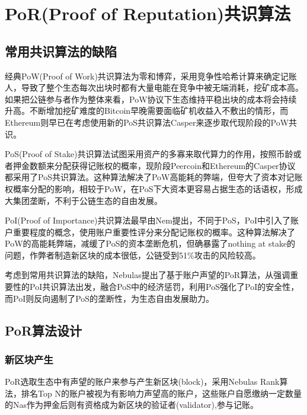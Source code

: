 \section{PoR(Proof of Reputation)共识算法}
\label{sec:por}

\subsection{常用共识算法的缺陷}
\label{por:weakness}

经典PoW(Proof of Work)共识算法为零和博弈，采用竞争性哈希计算来确定记账人，导致了整个生态每次出块时都有大量电能在竞争中被无端消耗，挖矿成本高。如果把公链参与者作为整体来看，PoW协议下生态维持平稳出块的成本将会持续升高。不断增加挖矿难度的Bitcoin早晚需要面临矿机收益入不敷出的情形，而Ethereum则早已在考虑使用新的PoS共识算法Casper\cite{casper}来逐步取代现阶段的PoW共识\cite{buterin2013ethereum}。

PoS(Proof of Stake)共识算法试图采用资产的多寡来取代算力的作用，按照币龄或者押金数额来分配获得记账权的概率，现阶段Peercoin\cite{king2012peercoin}和Ethereum的Casper协议都采用了PoS共识算法。这种算法解决了PoW高能耗的弊端，但夸大了资本对记账权概率分配的影响，相较于PoW，在PoS下大资本更容易占据生态的话语权，形成大集团垄断，不利于公链生态的自由发展。

PoI(Proof of Importance)共识算法最早由Nem提出\cite{nem}，不同于PoS，PoI中引入了账户重要程度的概念，使用账户重要性评分来分配记账权的概率。这种算法解决了PoW的高能耗弊端，减缓了PoS的资本垄断危机，但确暴露了nothing at stake的问题，作弊者制造新区块的成本很低，公链受到51\%攻击的风险较高。

考虑到常用共识算法的缺陷，Nebulas提出了基于账户声望的PoR算法，从强调重要性的PoI共识算法出发，融合PoS中的经济惩罚，利用PoS强化了PoI的安全性，而PoI则反向遏制了PoS的垄断性，为生态自由发展助力。

\subsection{PoR算法设计}
\label{por:design}

\subsubsection{新区块产生}
\label{por:design:block}

PoR选取生态中有声望的账户来参与产生新区块(block)，采用Nebulas Rank算法，排名Top N的账户被视为有影响力声望高的账户，这些账户自愿缴纳一定数量的Nas作为押金后则有资格成为新区块的验证者(validator),参与记账。

